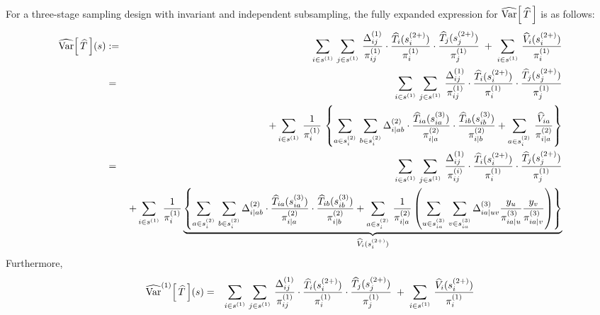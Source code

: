 \begin{corollary}\label{corollary:threeStage}\mbox{}\vskip 0.1cm
\noindent
For a three-stage sampling design with invariant and independent subsampling,
the fully expanded expression for $\widehat{\textnormal{Var}}\!\left[\,\widehat{T}\,\right]$ is as follows:
\begin{eqnarray*}
\widehat{\Var}\!\left[\,\widehat{T}\,\right]\!(s)
&:=&
\sum_{i\in s^{(1)}}\,\sum_{j\in s^{(1)}}\,
\dfrac{\Delta^{(1)}_{ij}}{\pi^{(1)}_{ij}}
\cdot
\dfrac{\widehat{T}_{i}(s^{(2+)}_{i})}{\pi^{(1)}_{i}}
\cdot
\dfrac{\widehat{T}_{j}(s^{(2+)}_{j})}{\pi^{(1)}_{j}}
\;+\;
\sum_{i\in s^{(1)}}\,\dfrac{\widehat{V}_{i}(s^{(2+)}_{i})}{\pi^{(1)}_{i}}
\\
&=&
\sum_{i\in s^{(1)}}\,\sum_{j\in s^{(1)}}\,
\dfrac{\Delta^{(1)}_{ij}}{\pi^{(1)}_{ij}}
\cdot
\dfrac{\widehat{T}_{i}(s^{(2+)}_{i})}{\pi^{(1)}_{i}}
\cdot
\dfrac{\widehat{T}_{j}(s^{(2+)}_{j})}{\pi^{(1)}_{j}}
\\&&
+
\sum_{i\in s^{(1)}}\,\dfrac{1}{\pi^{(1)}_{i}}\,\left\{
\sum_{a\in s^{(2)}_{i}}\,\sum_{b\in s^{(2)}_{i}}
\Delta^{(2)}_{i \vert ab}\cdot\dfrac{\widehat{T}_{ia}(s^{(3)}_{ia})}{\pi^{(2)}_{i \vert a}}\cdot\dfrac{\widehat{T}_{ib}(s^{(3)}_{ib})}{\pi^{(2)}_{i \vert b}}
+
\sum_{a \in s^{^{(2)}}_{i}}\,\dfrac{\widehat{V}_{ia}}{\pi^{(2)}_{i \vert a}}
\right\}
\\
&=&
\sum_{i\in s^{(1)}}\,\sum_{j\in s^{(1)}}\,
\dfrac{\Delta^{(1)}_{ij}}{\pi^{(i)}_{ij}}
\cdot
\dfrac{\widehat{T}_{i}(s^{(2+)}_{i})}{\pi^{(1)}_{i}}
\cdot
\dfrac{\widehat{T}_{j}(s^{(2+)}_{j})}{\pi^{(1)}_{j}}
\\&&
+
\sum_{i\in s^{(1)}}\,\dfrac{1}{\pi^{(1)}_{i}}\,
\underset{\widehat{V}_{i}(s^{(2+)}_{i})}{
\underbrace{
\left\{
\sum_{a\in s^{(2)}_{i}}\,\sum_{b\in s^{(2)}_{i}}
\Delta^{(2)}_{i \vert ab}\cdot\dfrac{\widehat{T}_{ia}(s^{(3)}_{ia})}{\pi^{(2)}_{i \vert a}}\cdot\dfrac{\widehat{T}_{ib}(s^{(3)}_{ib})}{\pi^{(2)}_{i \vert b}}
+
\sum_{a \in s^{^{(2)}}_{i}}\,\dfrac{1}{\pi^{(2)}_{i \vert a}}
\left(\sum_{u \in s^{(3)}_{ia}}\,\sum_{v \in s^{(3)}_{ia}}\Delta^{(3)}_{ia\vert uv}\dfrac{y_{u}}{\pi^{(3)}_{ia\vert u}}\dfrac{y_{v}}{\pi^{(3)}_{ia\vert v}}\right)
\right\}
}%
}%
\end{eqnarray*}
Furthermore,
\begin{eqnarray*}
\widehat{\Var}^{(1)}\!\left[\,\widehat{T}\,\right]\!(s)
&=&
\sum_{i\in s^{(1)}}\,\sum_{j\in s^{(1)}}\,
\dfrac{\Delta^{(1)}_{ij}}{\pi^{(1)}_{ij}}
\cdot
\dfrac{\widehat{T}_{i}(s^{(2+)}_{i})}{\pi^{(1)}_{i}}
\cdot
\dfrac{\widehat{T}_{j}(s^{(2+)}_{j})}{\pi^{(1)}_{j}}
\;+\;\sum_{i\in s^{(1)}}\,\dfrac{\widehat{V}_{i}(s^{(2+)}_{i})}{\pi^{(1)}_{i}}

\end{eqnarray*}
\end{corollary}
